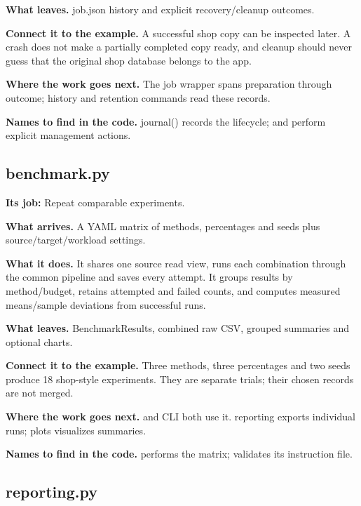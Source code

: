 \textbf{What leaves.} job.json history and explicit recovery/cleanup outcomes.

\textbf{Connect it to the example.} A successful shop copy can be inspected later. A crash does not make a partially completed copy ready, and cleanup should never guess that the original shop database belongs to the app.

\textbf{Where the work goes next.} The job wrapper spans preparation through outcome; history and retention commands read these records.

\textbf{Names to find in the code.} journal() records the lifecycle;  and  perform explicit management actions.


\subsection{benchmark.py}

\textbf{Its job:} Repeat comparable experiments.

\textbf{What arrives.} A YAML matrix of methods, percentages and seeds plus source/target/workload settings.

\textbf{What it does.} It shares one source read view, runs each combination through the common pipeline and saves every attempt. It groups results by method/budget, retains attempted and failed counts, and computes measured means/sample deviations from successful runs.

\textbf{What leaves.} BenchmarkResults, combined raw CSV, grouped summaries and optional charts.

\textbf{Connect it to the example.} Three methods, three percentages and two seeds produce 18 shop-style experiments. They are separate trials; their chosen records are not merged.

\textbf{Where the work goes next.}  and CLI both use it. reporting exports individual runs; plots visualizes summaries.

\textbf{Names to find in the code.}  performs the matrix;  validates its instruction file.


\subsection{reporting.py}

